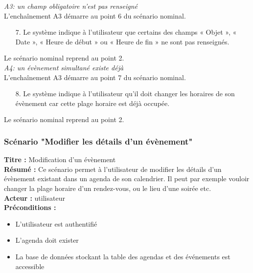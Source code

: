 \documentclass[12pt , a4paper]{article}
\begin{document}
\noindent\textit{A3: un champ obligatoire n'est pas renseigné}\\
L'encha\^inement A3 démarre au point 6 du scénario nominal.
\begin{enumerate}
\item[7.] Le système indique à l’utilisateur que certains des champs « Objet », « Date », « Heure de début » ou « Heure de fin » ne sont pas renseignés.
\end{enumerate}
Le scénario nominal reprend au point 2.\\


\noindent\textit{A4: un évènement simultané existe déjà}\\
L'encha\^inement A3 démarre au point 7 du scénario nominal.
\begin{enumerate}
\item[8.] Le système indique à l’utilisateur qu’il doit changer les horaires de son évènement car cette plage horaire est déjà occupée.
\end{enumerate}
Le scénario nominal reprend au point 2.\\



\subsubsection{Scénario "Modifier les détails d'un évènement"}
\noindent\textbf{Titre : } Modification d’un évènement\\
\textbf{Résumé : } Ce scénario permet à l’utilisateur de modifier les détails d’un évènement existant dans un agenda de son calendrier. Il peut par exemple vouloir changer la plage horaire d’un rendez-vous, ou le lieu d’une soirée etc.\\
\textbf{Acteur : }utilisateur\\

\noindent\textbf{Préconditions :}
\begin{itemize}
\item L’utilisateur est authentifié
\item L'agenda doit exister
\item La base de données stockant la table des agendas et des événements est accessible\\
\end{itemize}
\end{document}
